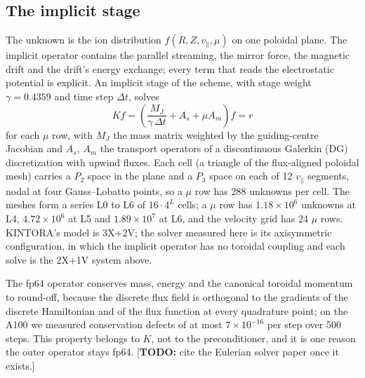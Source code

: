 \documentclass[11pt]{article}
\newcommand{\todo}[1]{\textcolor{red!70!black}{\small[\textbf{TODO:} #1]}}
\newcommand{\vpar}{v_\parallel}
\begin{document}
\subsection{The implicit stage}
The unknown is the ion distribution $f(R, Z, \vpar, \mu)$ on one poloidal plane.  The implicit
operator contains the parallel streaming, the mirror force, the magnetic drift and the drift's
energy exchange; every term that reads the electrostatic potential is explicit.  An implicit
stage of the scheme, with stage weight $\gamma = 0.4359$ and time step $\Delta t$, solves
\begin{equation}
  K f = \left( \frac{M_J}{\gamma\,\Delta t} + A_s + \mu A_m \right) f = r
  \label{eq:stage}
\end{equation}
for each $\mu$ row, with $M_J$ the mass matrix weighted by the guiding-centre Jacobian and $A_s$,
$A_m$ the transport operators of a discontinuous Galerkin (DG) discretization with upwind
fluxes.  Each cell (a triangle of the flux-aligned poloidal mesh) carries a $P_2$ space in the
plane and a $P_3$ space on each of 12 $\vpar$ segments, nodal at four Gauss--Lobatto points, so
a $\mu$ row has 288 unknowns per cell.  The meshes form a series L0 to L6 of $16 \cdot 4^L$
cells; a $\mu$ row has $1.18 \times 10^6$ unknowns at L4, $4.72 \times 10^6$ at L5 and
$1.89 \times 10^7$ at L6, and the velocity grid has 24 $\mu$ rows.  KINTORA's model is 3X+2V;
the solver measured here is its axisymmetric configuration, in which the implicit operator has
no toroidal coupling and each solve is the 2X+1V system above.

The fp64 operator conserves mass, energy and the canonical toroidal momentum to round-off,
because the discrete flux field is orthogonal to the gradients of the discrete Hamiltonian and
of the flux function at every quadrature point; on the A100 we measured conservation defects of
at most $7 \times 10^{-16}$ per step over 500 steps.  This property belongs to $K$, not to the
preconditioner, and it is one reason the outer operator stays fp64.
\todo{cite the Eulerian solver paper once it exists.}
\end{document}

